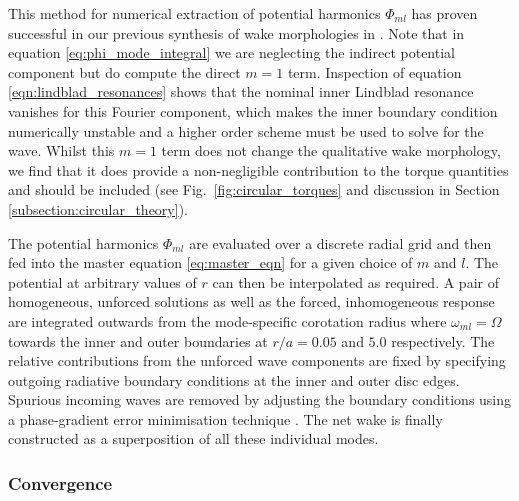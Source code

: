 This method for numerical extraction of potential harmonics $\Phi_{ml}$ has proven successful in our previous synthesis of wake morphologies in . Note that in equation \eqref{eq:phi_mode_integral} we are neglecting the indirect potential component but do compute the direct $m=1$ term. Inspection of equation \eqref{eqn:lindblad_resonances} shows that the nominal inner Lindblad resonance vanishes for this Fourier component, which makes the inner boundary condition numerically unstable and a higher order scheme must be used to solve for the wave. Whilst this $m=1$ term does not change the qualitative wake morphology, we find that it does provide a non-negligible contribution to the torque quantities and should be included (see Fig.~\ref{fig:circular_torques} and discussion in Section \ref{subsection:circular_theory}).

The potential harmonics $\Phi_{ml}$ are evaluated over a discrete radial grid and then fed into the master equation \eqref{eq:master_eqn} for a given choice of $m$ and $l$. The potential at arbitrary values of $r$ can then be interpolated as required. A pair of homogeneous, unforced solutions as well as the forced, inhomogeneous response are integrated outwards from the mode-specific corotation radius where $\omega_{ml}=\Omega$ towards the inner and outer boundaries at $r/a = 0.05$ and $5.0$ respectively. The relative contributions from the unforced wave components are fixed by specifying outgoing radiative boundary conditions at the inner and outer disc edges. Spurious incoming waves are removed by adjusting the boundary conditions using a phase-gradient error minimisation technique \citep{KorycanskyPollack_1993}. The net wake is finally constructed as a superposition of all these individual modes.

\subsubsection{Convergence}
\label{subsubsection:convergence}

